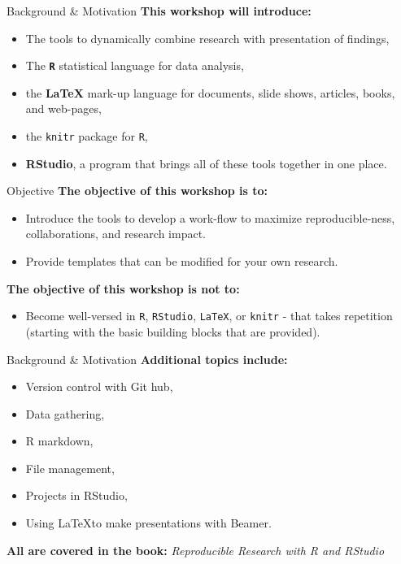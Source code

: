 \documentclass{beamer}\usepackage[]{graphicx}\usepackage[]{color}
\begin{document}
\begin{frame}[t]{Background \& Motivation}
   \textbf{This workshop will introduce:}
   \begin{itemize}
\item  The tools to dynamically combine research with presentation of findings,
     \item The \textbf{\texttt{R}} statistical language for data analysis,
     \item the \textbf{\LaTeX} mark-up language for documents, slide shows, articles, books, and web-pages,
     \item the \texttt{knitr} package for \texttt{R},
     \item \textbf{RStudio}, a program that brings all of these tools together in one place.
   \end{itemize}
 \end{frame}

 \begin{frame}[t]{Objective}
   \textbf{The objective of this workshop is to:}
   \begin{itemize}
      \item   Introduce the tools to develop a work-flow to maximize reproducible-ness, collaborations, and research impact.
      \item Provide templates that can be modified for your own research.
   \end{itemize}
   \textbf{The objective of this workshop is not to:}
   \begin{itemize}
      \item Become well-versed in \texttt{R}, \texttt{RStudio}, \texttt{\LaTeX}, or \texttt{knitr} - that takes repetition (starting with the basic building blocks that are provided).
   \end{itemize}
\end{frame}
 
\begin{frame}[t]{Background \& Motivation}
   \textbf{Additional topics include:}
   \begin{itemize}
\item  Version control with Git hub,
     \item Data gathering,
     \item R markdown,
     \item File management,
     \item Projects in RStudio,
     \item Using \LaTeX to make presentations with Beamer. 
   \end{itemize}
   \textbf{All are covered in the book:} \emph{Reproducible Research with R and RStudio}
\end{frame}
\end{document}
